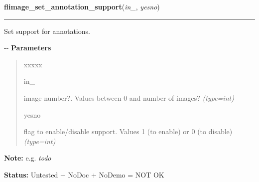    \label{xformslib:flflimage:flimage_set_annotation_support}

    \vspace{0.5ex}

\hspace{.8\funcindent}\begin{boxedminipage}{\funcwidth}

    \raggedright \textbf{flimage\_set\_annotation\_support}(\textit{in\_}, \textit{yesno})

    \vspace{-1.5ex}

    \rule{\textwidth}{0.5\fboxrule}
\setlength{\parskip}{2ex}

Set support for annotations.

-{}-
\setlength{\parskip}{1ex}
      \textbf{Parameters}
      \vspace{-1ex}

      \begin{quote}
        \begin{Ventry}{xxxxx}

          \item[in\_]


image number?. Values between 0 and number of images?
            {\it (type=int)}

          \item[yesno]


flag to enable/disable support. Values 1 (to enable) or 0 (to disable)
            {\it (type=int)}

        \end{Ventry}

      \end{quote}

\textbf{Note:} 
e.g. \emph{todo}


\textbf{Status:} 
Untested + NoDoc + NoDemo = NOT OK


    \end{boxedminipage}

    \label{xformslib:flflimage:flimage_getcolormap}

    \vspace{0.5ex}

